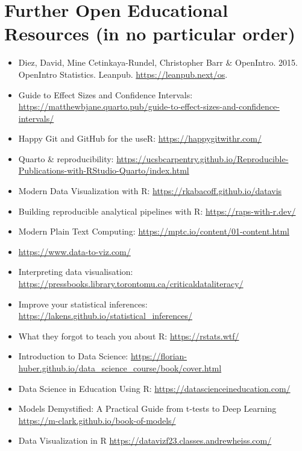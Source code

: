 \documentclass[
  letterpaper,
  DIV=11,
  numbers=noendperiod]{scrreprt}
\providecommand{\tightlist}{%
  \setlength{\itemsep}{0pt}\setlength{\parskip}{0pt}}\usepackage{longtable,booktabs,array}
\begin{document}
\section{Further Open Educational Resources (in no particular
order)}\label{further-open-educational-resources-in-no-particular-order}

\begin{itemize}
\tightlist
\item
  Diez, David, Mine Cetinkaya-Rundel, Christopher Barr \& OpenIntro.
  2015. OpenIntro Statistics. Leanpub. \url{https://leanpub.next/os}.
\item
  Guide to Effect Sizes and Confidence Intervals:
  \url{https://matthewbjane.quarto.pub/guide-to-effect-sizes-and-confidence-intervals/}
\item
  Happy Git and GitHub for the useR: \url{https://happygitwithr.com/}
\item
  Quarto \& reproducibility:
  \url{https://ucsbcarpentry.github.io/Reproducible-Publications-with-RStudio-Quarto/index.html}
\item
  Modern Data Visualization with R:
  \url{https://rkabacoff.github.io/datavis}
\item
  Building reproducible analytical pipelines with R:
  \url{https://raps-with-r.dev/}
\item
  Modern Plain Text Computing:
  \url{https://mptc.io/content/01-content.html}
\item
  \url{https://www.data-to-viz.com/}
\item
  Interpreting data visualisation:
  \url{https://pressbooks.library.torontomu.ca/criticaldataliteracy/}
\item
  Improve your statistical inferences:
  \url{https://lakens.github.io/statistical_inferences/}
\item
  What they forgot to teach you about R: \url{https://rstats.wtf/}
\item
  Introduction to Data Science:
  \url{https://florian-huber.github.io/data_science_course/book/cover.html}
\item
  Data Science in Education Using R:
  \url{https://datascienceineducation.com/}
\item
  Models Demystified: A Practical Guide from t-tests to Deep Learning
  \url{https://m-clark.github.io/book-of-models/}
\item
  Data Visualization in R
  \url{https://datavizf23.classes.andrewheiss.com/}
\end{itemize}
\end{document}
